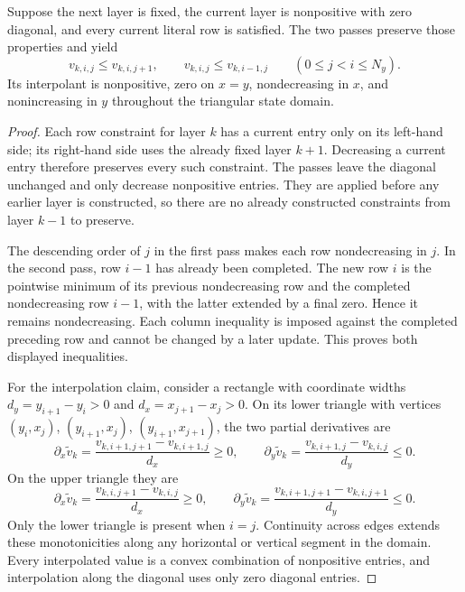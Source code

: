 \begin{lemma}
\label{lem:cert-iid-lowering}
Suppose the next layer is fixed, the current layer is nonpositive with
zero diagonal, and every current literal row is satisfied.  The two
passes preserve those properties and yield
\[
 v_{k,i,j}\le v_{k,i,j+1},\qquad
 v_{k,i,j}\le v_{k,i-1,j}\qquad(0\le j<i\le N_y).
\]
Its interpolant is nonpositive, zero on $x=y$, nondecreasing in $x$, and
nonincreasing in $y$ throughout the triangular state domain.
\end{lemma}
\begin{proof}
Each row constraint for layer $k$ has a current entry only on its left-hand
side; its right-hand side uses the already fixed layer $k+1$.  Decreasing
a current entry therefore preserves every such constraint.  The passes
leave the diagonal unchanged and only decrease nonpositive entries.
They are applied before any earlier layer is constructed, so there are no
already constructed constraints from layer $k-1$ to preserve.

The descending order of $j$ in the first pass makes each row
nondecreasing in $j$.  In the second pass, row $i-1$ has already been
completed.  The new row $i$ is the pointwise minimum of its previous
nondecreasing row and the completed nondecreasing row $i-1$, with the
latter extended by a final zero.  Hence it remains nondecreasing.  Each
column inequality is imposed against the completed preceding row and
cannot be changed by a later update.  This proves both displayed
inequalities.

For the interpolation claim, consider a rectangle with coordinate widths
$d_y=y_{i+1}-y_i>0$ and $d_x=x_{j+1}-x_j>0$.  On its lower triangle with
vertices $(y_i,x_j)$, $(y_{i+1},x_j)$, $(y_{i+1},x_{j+1})$, the two
partial derivatives are
\[
 \partial_x\widetilde v_k
   =\frac{v_{k,i+1,j+1}-v_{k,i+1,j}}{d_x}\ge0,
 \qquad
 \partial_y\widetilde v_k
   =\frac{v_{k,i+1,j}-v_{k,i,j}}{d_y}\le0.
\]
On the upper triangle they are
\[
 \partial_x\widetilde v_k
   =\frac{v_{k,i,j+1}-v_{k,i,j}}{d_x}\ge0,
 \qquad
 \partial_y\widetilde v_k
   =\frac{v_{k,i+1,j+1}-v_{k,i,j+1}}{d_y}\le0.
\]
Only the lower triangle is present when $i=j$.  Continuity across edges
extends these monotonicities along any horizontal or vertical segment in
the domain.  Every interpolated value is a convex combination of
nonpositive entries, and interpolation along the diagonal uses only
zero diagonal entries.
\end{proof}

